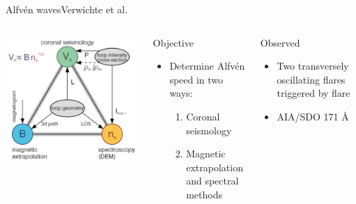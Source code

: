 \documentclass[11pt,table]{beamer}
\begin{document}
\begin{frame}{Alfv\'en waves}{Verwichte et al.}
    \begin{columns}
        \includegraphics[width=\textwidth]{tor2.png}
        \begin{block}{Objective}
            \begin{itemize}
                \item Determine Alfv\'en speed in two ways:
                    \begin{enumerate}
                        \item Coronal seismology
                        \item Magnetic extrapolation and spectral methods
                    \end{enumerate}
            \end{itemize}
        \end{block}
        \begin{block}{Observed}
            \begin{itemize}
                \item Two transversely oscillating flares triggered by flare
                \item AIA/SDO 171 \AA{}
            \end{itemize}
        \end{block}
    \end{columns}
\end{frame}%
\end{document}
